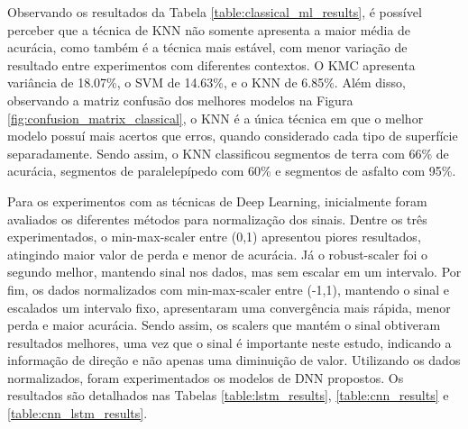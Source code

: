 Observando os resultados da Tabela \ref{table:classical_ml_results}, é possível perceber que a técnica de KNN não somente apresenta a maior média de acurácia, como também é a técnica mais estável, com menor variação de resultado entre experimentos com diferentes contextos. O KMC apresenta variância de 18.07\%, o SVM de 14.63\%, e o KNN de 6.85\%. Além disso, observando a matriz confusão dos melhores modelos na Figura \ref{fig:confusion_matrix_classical}, o KNN é a única técnica em que o melhor modelo possuí mais acertos que erros, quando considerado cada tipo de superfície separadamente. Sendo assim, o KNN classificou segmentos de terra com 66\% de acurácia, segmentos de paralelepípedo com 60\% e segmentos de asfalto com 95\%.

Para os experimentos com as técnicas de Deep Learning, inicialmente foram avaliados os diferentes métodos para normalização dos sinais. Dentre os três experimentados, o min-max-scaler entre (0,1) apresentou piores resultados, atingindo maior valor de perda e menor de acurácia. Já o robust-scaler foi o segundo melhor, mantendo sinal nos dados, mas sem escalar em um intervalo. Por fim, os dados normalizados com min-max-scaler entre (-1,1), mantendo o sinal e escalados um intervalo fixo, apresentaram uma convergência mais rápida, menor perda e maior acurácia. Sendo assim, os scalers que mantém o sinal obtiveram resultados melhores, uma vez que o sinal é importante neste estudo, indicando a informação de direção e não apenas uma diminuição de valor. Utilizando os dados normalizados, foram experimentados os modelos de DNN propostos. Os resultados são detalhados nas Tabelas \ref{table:lstm_results}, \ref{table:cnn_results} e \ref{table:cnn_lstm_results}.


